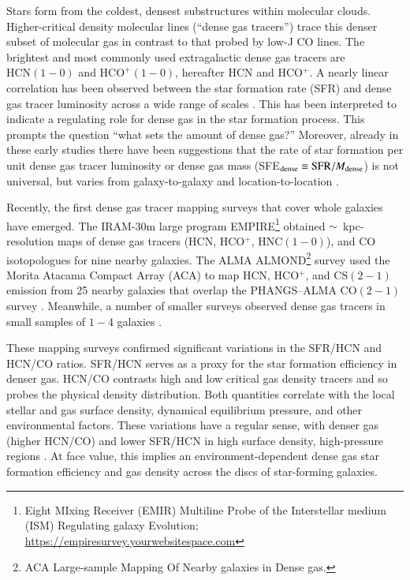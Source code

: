 \documentclass[letter, longauth]{aa} %
\newcommand*{\hcnone}{\ensuremath{\mathrm{HCN(1-0)}}\xspace} %
\newcommand*{\hcopone}{\ensuremath{\text{HCO}^+\mathrm{(1-0)}}\xspace} %
\newcommand*{\hncone}{\ensuremath{\mathrm{HNC(1-0)}}\xspace} %
\newcommand*{\cstwo}{\ensuremath{\mathrm{CS(2-1)}}\xspace} %
\newcommand*{\cotwo}{\ensuremath{\mathrm{CO(2-1)}}\xspace} %
\begin{document}
Stars form from the coldest, densest substructures within molecular clouds. 
Higher-critical density molecular lines (``dense gas tracers'') trace this denser subset of molecular gas in contrast to that probed by low-J CO lines.
The brightest and most commonly used extragalactic dense gas tracers are \hcnone and \hcopone, hereafter HCN and HCO$^+$. A nearly linear correlation has been observed between the star formation rate (SFR) and dense gas tracer luminosity across a wide range of scales \citep[e.g.,][]{Gao2004, Wu2010, Garcia-Burillo2012, Usero2015, Chen2017}. This has been interpreted to indicate a regulating role for dense gas in the star formation process. This prompts the question ``what sets the amount of dense gas?'' Moreover, already in these early studies there have been suggestions that the rate of star formation per unit dense gas tracer luminosity or dense gas mass (SFE$_{\rm dense} \equiv {\rm SFR}/M_{\rm dense}$) is not universal, but varies from galaxy-to-galaxy and location-to-location \citep[][]{Garcia-Burillo2012, Usero2015, Chen2015}.

Recently, the first dense gas tracer mapping surveys that cover whole galaxies have emerged. The IRAM-30m large program EMPIRE\footnote{Eight MIxing Receiver (EMIR) Multiline Probe of the Interstellar medium (ISM) Regulating galaxy Evolution; \url{https://empiresurvey.yourwebsitespace.com}} \citep[][]{Bigiel2016, Jimenez-Donaire2017, Jimenez-Donaire2019} obtained $\sim$~kpc-resolution maps of dense gas tracers (HCN, HCO$^+$, \hncone), and CO isotopologues for nine nearby galaxies. The ALMA ALMOND\footnote{ACA Large-sample Mapping Of Nearby galaxies in Dense gas.} survey \citep{Neumann2023a} used the Morita Atacama Compact Array (ACA) to map HCN, HCO$^+$, and \cstwo emission from 25 nearby galaxies that overlap the PHANGS--ALMA  \cotwo survey \citep{Leroy2021a}. 
Meanwhile, a number of smaller surveys observed dense gas tracers in small samples of $1{-}4$ galaxies \citep[e.g.][]{Tan2018, Gallagher2018a, Gallagher2018b, Querejeta2019, Beslic2021, Heyer2022, Neumann2024, Lin2024}. 

These mapping surveys confirmed significant variations in the SFR/HCN and HCN/CO ratios.
SFR/HCN serves as a proxy for the star formation efficiency in denser gas.
HCN/CO contrasts high and low critical gas density tracers and so probes the physical density distribution. 
Both quantities correlate with the local stellar and gas surface density, dynamical equilibrium pressure, and other environmental factors. 
These variations have a regular sense, with denser gas (higher HCN/CO) and lower SFR/HCN in high surface density, high-pressure regions \citep[e.g.][]{Jimenez-Donaire2019}.  
At face value, this implies an environment-dependent dense gas star formation efficiency and gas density across the discs of star-forming galaxies.
\end{document}
